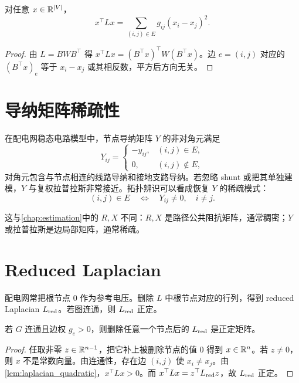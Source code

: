 \begin{lemma}[拉普拉斯二次型]
\label{lem:laplacian_quadratic}
对任意 $x\in\mathbb{R}^{|V|}$，
\begin{equation}
  x^\top Lx=\sum_{(i,j)\in E}g_{ij}(x_i-x_j)^2.
\end{equation}
\end{lemma}

\begin{proof}
由 $L=BWB^\top$ 得 $x^\top Lx=(B^\top x)^\top W(B^\top x)$。边 $e=(i,j)$ 对应的 $(B^\top x)_e$ 等于 $x_i-x_j$ 或其相反数，平方后方向无关。
\end{proof}

\section{导纳矩阵稀疏性}

在配电网稳态电路模型中，节点导纳矩阵 $Y$ 的非对角元满足
\begin{equation}
  Y_{ij}=
  \begin{cases}
    -y_{ij},& (i,j)\in E,\\
    0,& (i,j)\notin E,
  \end{cases}
\end{equation}
对角元包含与节点相连的线路导纳和接地支路导纳。若忽略 shunt 或把其单独建模，$Y$ 与复权拉普拉斯非常接近。拓扑辨识可以看成恢复 $Y$ 的稀疏模式：
\begin{equation}
  (i,j)\in E \quad \Longleftrightarrow \quad Y_{ij}\ne 0,\quad i\ne j .
\end{equation}

这与\cref{chap:estimation}中的 $R,X$ 不同：$R,X$ 是路径公共阻抗矩阵，通常稠密；$Y$ 或拉普拉斯是边局部矩阵，通常稀疏。

\section{Reduced Laplacian}

配电网常把根节点 $0$ 作为参考电压。删除 $L$ 中根节点对应的行列，得到 reduced Laplacian $L_{\rm red}$。若图连通，则 $L_{\rm red}$ 正定。

\begin{proposition}
\label{prop:reduced_laplacian_pd}
若 $G$ 连通且边权 $g_e>0$，则删除任意一个节点后的 $L_{\rm red}$ 是正定矩阵。
\end{proposition}

\begin{proof}
任取非零 $z\in\mathbb{R}^{n-1}$，把它补上被删除节点的值 $0$ 得到 $x\in\mathbb{R}^n$。若 $z\ne 0$，则 $x$ 不是常数向量。由连通性，存在边 $(i,j)$ 使 $x_i\ne x_j$。由\cref{lem:laplacian_quadratic}，$x^\top Lx>0$。而 $x^\top Lx=z^\top L_{\rm red}z$，故 $L_{\rm red}$ 正定。
\end{proof}

